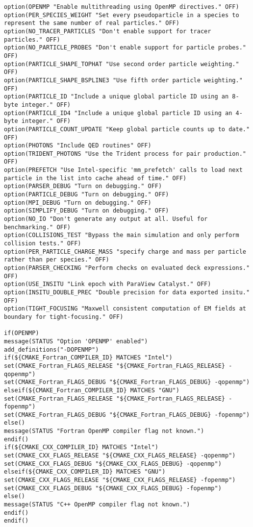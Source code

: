 \begin{lstlisting}[style=FORTRAN, caption=EPOCH CMakeLists file to generate platform-specific build scripts]
option(OPENMP "Enable multithreading using OpenMP directives." OFF)
option(PER_SPECIES_WEIGHT "Set every pseudoparticle in a species to represent the same number of real particles." OFF)
option(NO_TRACER_PARTICLES "Don't enable support for tracer particles." OFF)
option(NO_PARTICLE_PROBES "Don't enable support for particle probes." OFF)
option(PARTICLE_SHAPE_TOPHAT "Use second order particle weighting." OFF)
option(PARTICLE_SHAPE_BSPLINE3 "Use fifth order particle weighting." OFF)
option(PARTICLE_ID "Include a unique global particle ID using an 8-byte integer." OFF)
option(PARTICLE_ID4 "Include a unique global particle ID using an 4-byte integer." OFF)
option(PARTICLE_COUNT_UPDATE "Keep global particle counts up to date." OFF)
option(PHOTONS "Include QED routines" OFF)
option(TRIDENT_PHOTONS "Use the Trident process for pair production." OFF)
option(PREFETCH "Use Intel-specific 'mm_prefetch' calls to load next particle in the list into cache ahead of time." OFF)
option(PARSER_DEBUG "Turn on debugging." OFF)
option(PARTICLE_DEBUG "Turn on debugging." OFF)
option(MPI_DEBUG "Turn on debugging." OFF)
option(SIMPLIFY_DEBUG "Turn on debugging." OFF)
option(NO_IO "Don't generate any output at all. Useful for benchmarking." OFF)
option(COLLISIONS_TEST "Bypass the main simulation and only perform collision tests." OFF)
option(PER_PARTICLE_CHARGE_MASS "specify charge and mass per particle rather than per species." OFF)
option(PARSER_CHECKING "Perform checks on evaluated deck expressions." OFF)
option(USE_INSITU "Link epoch with ParaView Catalyst." OFF)
option(INSITU_DOUBLE_PREC "Double precision for data exported insitu." OFF)
option(TIGHT_FOCUSING "Maxwell consistent computation of EM fields at boundary for tight-focusing." OFF)

if(OPENMP)
message(STATUS "Option 'OPENMP' enabled")
add_definitions("-DOPENMP")
if(${CMAKE_Fortran_COMPILER_ID} MATCHES "Intel")
set(CMAKE_Fortran_FLAGS_RELEASE "${CMAKE_Fortran_FLAGS_RELEASE} -qopenmp")
set(CMAKE_Fortran_FLAGS_DEBUG "${CMAKE_Fortran_FLAGS_DEBUG} -qopenmp")
elseif(${CMAKE_Fortran_COMPILER_ID} MATCHES "GNU")
set(CMAKE_Fortran_FLAGS_RELEASE "${CMAKE_Fortran_FLAGS_RELEASE} -fopenmp")
set(CMAKE_Fortran_FLAGS_DEBUG "${CMAKE_Fortran_FLAGS_DEBUG} -fopenmp")
else()
message(STATUS "Fortran OpenMP compiler flag not known.")
endif()
if(${CMAKE_CXX_COMPILER_ID} MATCHES "Intel")
set(CMAKE_CXX_FLAGS_RELEASE "${CMAKE_CXX_FLAGS_RELEASE} -qopenmp")
set(CMAKE_CXX_FLAGS_DEBUG "${CMAKE_CXX_FLAGS_DEBUG} -qopenmp")
elseif(${CMAKE_CXX_COMPILER_ID} MATCHES "GNU")
set(CMAKE_CXX_FLAGS_RELEASE "${CMAKE_CXX_FLAGS_RELEASE} -fopenmp")
set(CMAKE_CXX_FLAGS_DEBUG "${CMAKE_CXX_FLAGS_DEBUG} -fopenmp")
else()
message(STATUS "C++ OpenMP compiler flag not known.")
endif()
endif()


\end{lstlisting}
